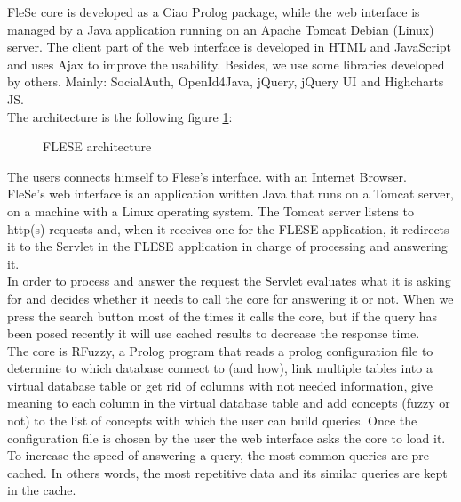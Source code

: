 \documentclass[a4paper,twoside]{article}
\begin{document}
FleSe core is developed as a Ciao Prolog package, while the web interface is managed by a Java application running on an Apache Tomcat Debian (Linux) server. The client part of the web interface is developed in HTML and JavaScript and uses Ajax to improve the usability. Besides, we use some libraries developed by others. Mainly: SocialAuth, OpenId4Java, jQuery, jQuery UI and Highcharts JS.\\

The architecture is the following figure \ref{fig:architecture}:

\begin{figure}[!h]
  \centering
   {}
  \caption{FLESE architecture}
  \label{fig:architecture}
 \end{figure}

The users connects himself to Flese's interface. with an Internet Browser. \\
 FleSe’s web interface is an application written Java that runs on a Tomcat server, on a machine with a Linux operating system. The Tomcat server listens to http(s) requests and, when it receives one for the FLESE application, it redirects it to the Servlet in the FLESE application in charge of processing and answering it. \\

In order to process and answer the request the Servlet evaluates what it is asking for and decides whether it needs to call the core for answering it or not. When we press the search button most of the times it calls the core, but if the query has been posed recently it will use cached results to decrease the response time. \\

The core is RFuzzy, a Prolog program that reads a prolog configuration file to determine to which database connect to (and how),  link multiple tables into a virtual database table or get rid of columns with not needed information, give meaning to each column in the virtual database table and add concepts (fuzzy or not) to the list of concepts with which the user can build queries. Once the configuration file is chosen by the user the web interface asks the core to load it. \\

To increase the speed of answering a query, the most common queries are pre-cached. In others words, the most repetitive data and its similar queries are kept in the cache.
\end{document}
